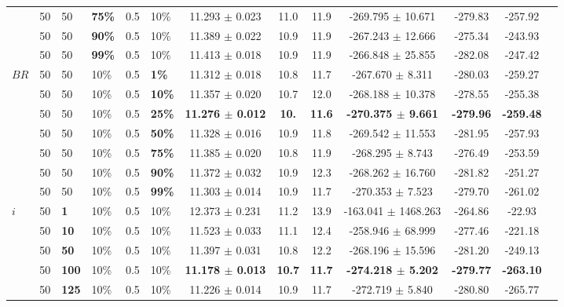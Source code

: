 \begin{sidewaystable}
\begin{tabular}{|l|l|l|l|l|l||c|c|c|c|c|c|c|}
    ~ & 50 & 50 & \textbf{75\%} & 0.5 & 10\% & 11.293 $\pm$ 0.023 & 11.0 & 11.9 & -269.795 $\pm$ 10.671 & -279.83 & -257.92 \\
    ~ & 50 & 50 & \textbf{90\%} & 0.5 & 10\% & 11.389 $\pm$ 0.022 & 10.9 & 11.9 & -267.243 $\pm$ 12.666 & -275.34 & -243.93 \\
    ~ & 50 & 50 & \textbf{99\%} & 0.5 & 10\% & 11.413 $\pm$ 0.018 & 10.9 & 11.9 & -266.848 $\pm$ 25.855 & -282.08 & -247.42  \\
    \hline
    $BR$ & 50 & 50 & 10\% & 0.5 & \textbf{1\%} & 11.312 $\pm$ 0.018 & 10.8 & 11.7 & -267.670 $\pm$ 8.311 & -280.03 & -259.27 \\
    ~    & 50 & 50 & 10\% & 0.5 & \textbf{10\%} & 11.357 $\pm$ 0.020 & 10.7 & 12.0 & -268.188 $\pm$ 10.378 & -278.55 & -255.38 \\
    ~    & 50 & 50 & 10\% & 0.5 & \textbf{25\%} & \textbf{11.276 $\pm$ 0.012} & \textbf{10.} & \textbf{11.6} & \textbf{-270.375 $\pm$ 9.661} & \textbf{-279.96} & \textbf{-259.48} \\
    ~    & 50 & 50 & 10\% & 0.5 & \textbf{50\%} & 11.328 $\pm$ 0.016 & 10.9 & 11.8 & -269.542 $\pm$ 11.553 & -281.95 & -257.93 \\
    ~    & 50 & 50 & 10\% & 0.5 & \textbf{75\%} & 11.385 $\pm$ 0.020 & 10.8 & 11.9 & -268.295 $\pm$ 8.743 & -276.49 & -253.59 \\
    ~    & 50 & 50 & 10\% & 0.5 & \textbf{90\%} & 11.372 $\pm$ 0.032 & 10.9 & 12.3 & -268.262 $\pm$ 16.760 & -281.82 & -251.27 \\
    ~    & 50 & 50 & 10\% & 0.5 & \textbf{99\%} & 11.303 $\pm$ 0.014 & 10.9 & 11.7 & -270.353 $\pm$ 7.523 & -279.70 & -261.02  \\
    \hline
    $i$ & 50 & \textbf{1} & 10\% & 0.5 & 10\% & 12.373 $\pm$ 0.231 & 11.2 & 13.9& -163.041 $\pm$ 1468.263 & -264.86 & -22.93  \\
    ~   & 50 &\textbf{10} & 10\% & 0.5 & 10\% & 11.523 $\pm$ 0.033 & 11.1 & 12.4 & -258.946 $\pm$ 68.999 & -277.46& -221.18 \\
    ~   & 50 &\textbf{50} & 10\% & 0.5 & 10\% & 11.397 $\pm$ 0.031 & 10.8 & 12.2 & -268.196 $\pm$ 15.596 & -281.20 & -249.13 \\
    ~   & 50 &\textbf{100} & 10\% & 0.5 & 10\% & \textbf{11.178 $\pm$ 0.013} & \textbf{10.7} & \textbf{11.7} & \textbf{-274.218 $\pm$ 5.202} & \textbf{-279.77} & \textbf{-263.10} \\
    ~   & 50 &\textbf{125} & 10\% & 0.5 & 10\% & 11.226 $\pm$ 0.014 & 10.9 & 11.7 & -272.719 $\pm$ 5.840 & -280.80 & -265.77  \\

\end{tabular}
\end{sidewaystable}
